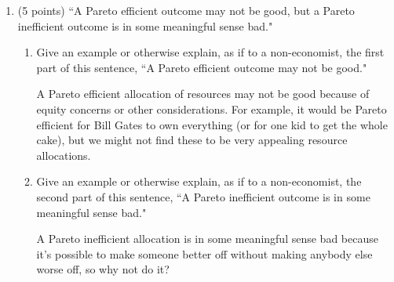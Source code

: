 \documentclass[twoside]{article}
\newcommand{\mybigskip}{\vspace{1in}}
\begin{document}
\begin{enumerate}
\begin{enumerate}
\begin{KEY}
Backward induction predicts an outcome of (8, 8).
\end{KEY}

    \item \begin{EXAM} (5 points) Is this outcome Pareto efficient? If it is not Pareto efficient, identify a Pareto improvement. \clearpage \end{EXAM}

\begin{KEY}
No; a Pareto improvement is (10, 10).
\end{KEY}

    \end{enumerate}









\item \begin{EXAM} (5 points) ``A Pareto efficient outcome may not be good, but a Pareto inefficient outcome is in some meaningful sense bad."\end{EXAM}

    \begin{enumerate}
    \item \begin{EXAM} Give an example or otherwise explain, as if to a non-economist, the first part of this sentence, ``A Pareto efficient outcome may not be good." \end{EXAM}

\begin{KEY}
A Pareto efficient allocation of resources may not be good because of equity concerns or other considerations. For example, it would be Pareto efficient for Bill Gates to own everything (or for one kid to get the whole cake), but we might not find these to be very appealing resource allocations.
\end{KEY}


    \item \begin{EXAM} Give an example or otherwise explain, as if to a non-economist, the second part of this sentence, ``A Pareto inefficient outcome is in some meaningful sense bad." \end{EXAM}

\begin{KEY}
A Pareto inefficient allocation is in some meaningful sense bad because it's possible to make someone better off without making anybody else worse off, so why not do it?
\end{KEY}


\end{enumerate}
\end{enumerate}
\end{document}
